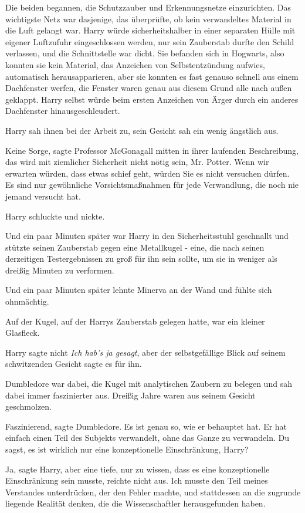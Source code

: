 Die beiden begannen, die Schutzzauber und Erkennungsnetze einzurichten. Das
wichtigste Netz war dasjenige, das überprüfte, ob kein verwandeltes Material in
die Luft gelangt war. Harry würde sicherheitshalber in einer separaten Hülle mit
eigener Luftzufuhr eingeschlossen werden, nur sein Zauberstab durfte den Schild
verlassen, und die Schnittstelle war dicht. Sie befanden sich in Hogwarts, also
konnten sie kein Material, das Anzeichen von Selbstentzündung aufwies,
automatisch herausapparieren, aber sie konnten es fast genauso schnell aus einem
Dachfenster werfen, die Fenster waren genau aus diesem Grund alle nach außen
geklappt. Harry selbst würde beim ersten Anzeichen von Ärger durch ein anderes
Dachfenster hinausgeschleudert.

Harry sah ihnen bei der Arbeit zu, sein Gesicht sah ein wenig ängstlich aus.

\glqq{}Keine Sorge\grqq{}, sagte Professor McGonagall mitten in ihrer laufenden
Beschreibung, \glqq{}das wird mit ziemlicher Sicherheit nicht nötig sein, Mr.
Potter. Wenn wir erwarten würden, dass etwas schief geht, würden Sie es nicht
versuchen dürfen. Es sind nur gewöhnliche Vorsichtsmaßnahmen für jede
Verwandlung, die noch nie jemand versucht hat.\grqq{}

Harry schluckte und nickte.

Und ein paar Minuten später war Harry in den Sicherheitsstuhl geschnallt und
stützte seinen Zauberstab gegen eine Metallkugel - eine, die nach seinen
derzeitigen Testergebnissen zu groß für ihn sein sollte, um sie in weniger als
dreißig Minuten zu verformen.

Und ein paar Minuten später lehnte Minerva an der Wand und fühlte sich
ohnmächtig.

Auf der Kugel, auf der Harrys Zauberstab gelegen hatte, war ein kleiner
Glasfleck.

Harry sagte nicht \emph{\glqq{}Ich hab's ja gesagt\grqq{}}, aber der
selbstgefällige Blick auf seinem schwitzenden Gesicht sagte es für ihn.

Dumbledore war dabei, die Kugel mit analytischen Zaubern zu belegen und sah
dabei immer faszinierter aus. Dreißig Jahre waren aus seinem Gesicht
geschmolzen.

\glqq{}Faszinierend\grqq{}, sagte Dumbledore. \glqq{}Es ist genau so, wie er
behauptet hat. Er hat einfach einen Teil des Subjekts verwandelt, ohne das Ganze
zu verwandeln. Du sagst, es ist wirklich nur eine konzeptionelle Einschränkung,
Harry?\grqq{}

\glqq{}Ja\grqq{}, sagte Harry, \glqq{}aber eine tiefe, nur zu wissen, dass es
eine konzeptionelle Einschränkung sein musste, reichte nicht aus. Ich musste den
Teil meines Verstandes unterdrücken, der den Fehler machte, und stattdessen an
die zugrunde liegende Realität denken, die die Wissenschaftler herausgefunden
haben.\grqq{}

